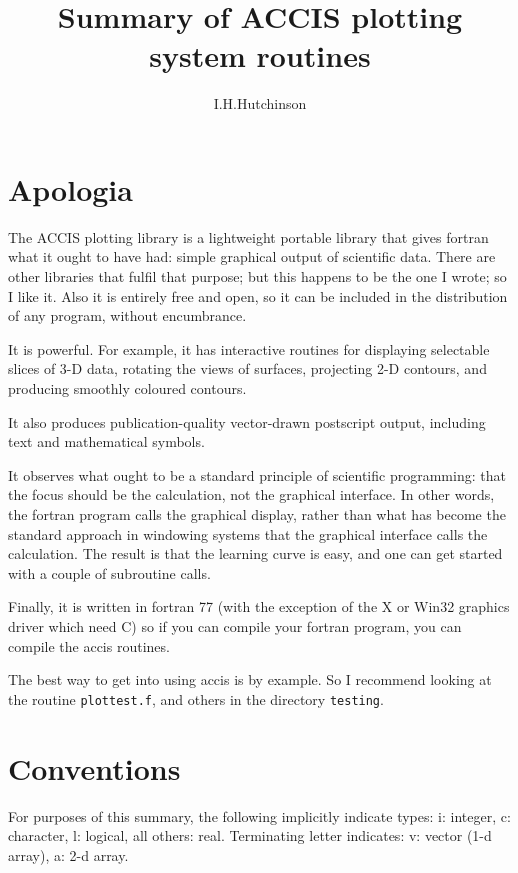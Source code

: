 \documentclass[12pt]{article}
\title{Summary of ACCIS plotting system routines}
\author{I.H.Hutchinson}
\date{}
\begin{document}
\maketitle

\tableofcontents

\section{Apologia}

The ACCIS plotting library is a lightweight portable library that
gives fortran what it ought to have had: simple graphical output of
scientific data. There are other libraries that fulfil that purpose;
but this happens to be the one I wrote; so I like it. Also it is
entirely free and open, so it can be included in the distribution of
any program, without encumbrance. 

It is powerful. For example, it has interactive routines for
displaying selectable slices of 3-D data, rotating the views of
surfaces, projecting 2-D contours, and producing smoothly coloured
contours.

It also produces publication-quality vector-drawn postscript output,
including text and mathematical symbols.

It observes what ought to be a standard principle of scientific
programming: that the focus should be the calculation, not the
graphical interface. In other words, the fortran program calls the
graphical display, rather than what has become the standard approach
in windowing systems that the graphical interface calls the
calculation. The result is that the learning curve is easy, and one
can get started with a couple of subroutine calls.

Finally, it is written in fortran 77 (with the exception of the X or
Win32 graphics driver which need C) so if you can compile your
fortran program, you can compile the accis routines.

The best way to get into using accis is by example. So I recommend
looking at the routine \verb!plottest.f!, and others in the directory
\verb!testing!.

\section{Conventions}

For purposes of this summary, the following implicitly indicate types:
i: integer, c: character, l: logical, all others: real.  Terminating
letter indicates: v: vector (1-d array), a: 2-d array.  
\end{document}
